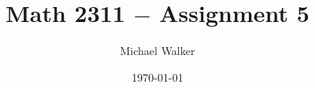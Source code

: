 \documentclass[11pt]{article}
\author{Michael Walker}
\title{Math 2311 $-$ Assignment 5}
\date{\today}
\begin{document}
\maketitle
\pagebreak

\tableofcontents
\pagebreak








\pagebreak

\end{document}
